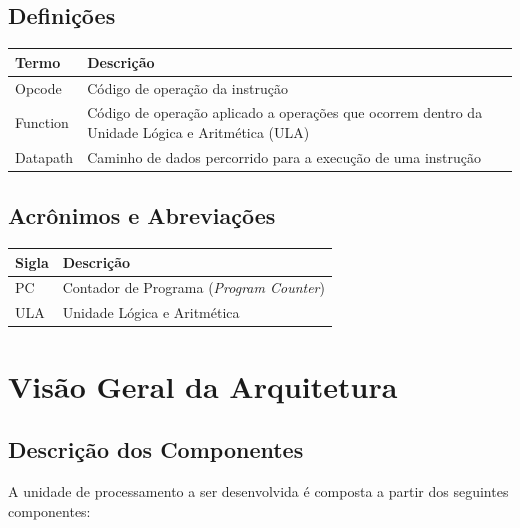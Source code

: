 \documentclass{report}
\begin{document}
  \section{Definições}
    \FloatBarrier
    \begin{table}[H]
      \begin{center}
        \begin{tabular}[pos]{|m{5cm} | m{9cm}|} 
          \hline
          \cellcolor[gray]{0.9}\textbf{Termo} & \cellcolor[gray]{0.9}\textbf{Descrição} \\ \hline
           Opcode   & Código de operação da instrução \\ \hline
           Function & Código de operação aplicado a operações que ocorrem dentro da Unidade Lógica e Aritmética (ULA)  \\ \hline
           Datapath & Caminho de dados percorrido para a execução de uma instrução \\ \hline
        \end{tabular}
      \end{center}
    \end{table}  

  \section{Acrônimos e Abreviações}
    \FloatBarrier
    \begin{table}[H]
      \begin{center}
        \begin{tabular}[pos]{|m{2cm} | m{12cm}|} 
          \hline
          \cellcolor[gray]{0.9}\textbf{Sigla} & \cellcolor[gray]{0.9}\textbf{Descrição} \\ \hline
             PC       &  Contador de Programa (\textit{Program Counter})\\ \hline
             ULA      &  Unidade Lógica e Aritmética\\ \hline
        \end{tabular}
      \end{center}
    \end{table}  

\chapter{Visão Geral da Arquitetura}
  \section{Descrição dos Componentes}
  A unidade de processamento a ser desenvolvida é composta a partir dos seguintes componentes:
  
\end{document}

